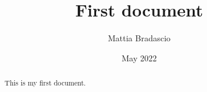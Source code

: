 \documentclass[12pt, letterpaper]{article}
\title{First document}
\author{Mattia Bradascio}
\date{May 2022}
\begin{document}
\begin{titlepage}
\maketitle
\end{titlepage}

\begin{abstract}
This is my first document.
\end{abstract}
\end{document}
